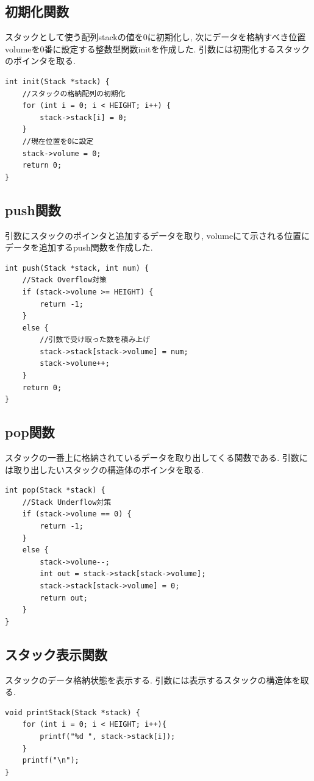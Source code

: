 \documentclass[a4j]{jsarticle}
\begin{document}
    \subsection{初期化関数}
    スタックとして使う配列stackの値を0に初期化し, 次にデータを格納すべき位置volumeを0番に設定する整数型関数initを作成した. 
    引数には初期化するスタックのポインタを取る. 
    \begin{lstlisting}[label = init, caption = 初期化関数init]
int init(Stack *stack) {
	//スタックの格納配列の初期化
	for (int i = 0; i < HEIGHT; i++) {
		stack->stack[i] = 0;
	}
	//現在位置を0に設定
	stack->volume = 0;
	return 0;
}
    \end{lstlisting}

    \subsection{push関数}
    引数にスタックのポインタと追加するデータを取り, volumeにて示される位置にデータを追加するpush関数を作成した. 
    \begin{lstlisting}[label = push, caption = push関数]
int push(Stack *stack, int num) {
	//Stack Overflow対策
	if (stack->volume >= HEIGHT) {
		return -1;
	}
	else {
		//引数で受け取った数を積み上げ
		stack->stack[stack->volume] = num;
		stack->volume++;
	}
	return 0;
}
    \end{lstlisting}
    \subsection{pop関数}
    スタックの一番上に格納されているデータを取り出してくる関数である. 引数には取り出したいスタックの構造体のポインタを取る. 
    \begin{lstlisting}[label = pop, caption = pop関数]
int pop(Stack *stack) {
	//Stack Underflow対策
	if (stack->volume == 0) {
		return -1;
	}
	else {
		stack->volume--;
		int out = stack->stack[stack->volume];
		stack->stack[stack->volume] = 0;
		return out;
	}
}
    \end{lstlisting}
    \subsection{スタック表示関数}
    スタックのデータ格納状態を表示する. 引数には表示するスタックの構造体を取る. 　
    \begin{lstlisting}[label = printstack, caption = スタック表示関数]
void printStack(Stack *stack) {
	for (int i = 0; i < HEIGHT; i++){
		printf("%d ", stack->stack[i]);
	}
	printf("\n");
}
    \end{lstlisting}
    
\end{document}
